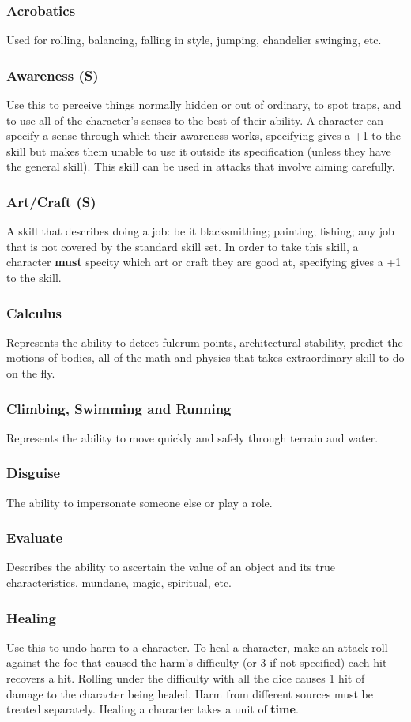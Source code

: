 \subsubsection*{Acrobatics}
Used for rolling, balancing, falling in style, jumping, chandelier swinging, etc.
\subsubsection*{Awareness (S)}
Use this to perceive things normally hidden or out of ordinary, to spot traps, and to use all of the character's senses to the best of their ability. A character can specify a sense through which their awareness works, specifying gives a +1 to the skill but makes them unable to use it outside its specification (unless they have the general skill). This skill can be used in attacks that involve aiming carefully.
\subsubsection*{Art/Craft (S)}
A skill that describes doing a job: be it blacksmithing; painting; fishing; any job that is not covered by the standard skill set. In order to take this skill, a character \textbf{must} specity which art or craft they are good at, specifying gives a +1 to the skill.
\subsubsection*{Calculus}
Represents the ability to detect fulcrum points, architectural stability, predict the motions of bodies, all of the math and physics that takes extraordinary skill to do on the fly.
\subsubsection*{Climbing, Swimming and Running}
Represents the ability to move quickly and safely through terrain and water.
\subsubsection*{Disguise}
The ability to impersonate someone else or play a role.
\subsubsection*{Evaluate}
Describes the ability to ascertain the value of an object and its true characteristics, mundane, magic, spiritual, etc.
\subsubsection*{Healing}
Use this to undo harm to a character. To heal a character, make an attack roll against the foe that caused the harm's difficulty (or 3 if not specified) each hit recovers a hit. Rolling under the difficulty with all the dice causes 1 hit of damage to the character being healed. Harm from different sources must be treated separately. Healing a character takes a unit of \textbf{time}.
